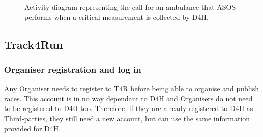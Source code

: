             \begin{figure}[H]
                \centering
                \caption{Activity diagram representing the call for an ambulance that ASOS performs when a critical measurement is collected by D4H.}
                \label{fig:ASOS-activity-diagram1}
            \end{figure}
            
    \subsection{Track4Run}
        
        \subsubsection{Organiser registration and log in}
            Any Organiser needs to register to T4R before being able to organise and publish races. This account is in no way dependant to D4H and Organisers do not need to be registered to D4H too. Therefore, if they are already registered to D4H as Third-parties, they still need a new account, but can use the same information provided for D4H. 
            
